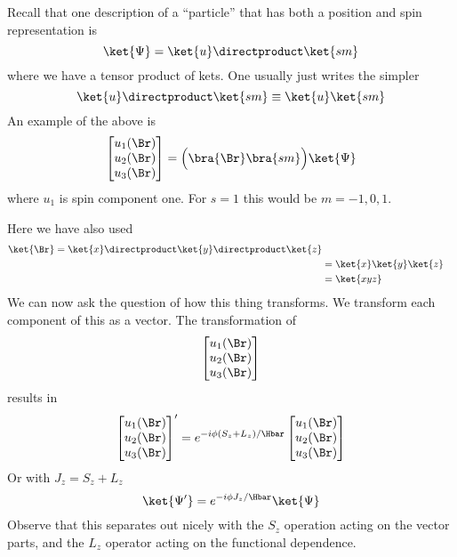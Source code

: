 Recall that one description of a ``particle'' that has both a position and spin representation is
%
\begin{equation}\label{eqn:PHY356FDec7:190}
\ket{\Psi} = \ket{u} \directproduct \ket{s m}
\end{equation}
%
where we have a tensor product of kets.  One usually just writes the simpler
\begin{equation}\label{eqn:PHY356FDec7:195}
\ket{u} \directproduct \ket{s m} \equiv \ket{u} \ket{s m}
\end{equation}
%
An example of the above is
\begin{equation}\label{eqn:PHY356FDec7:200}
\begin{bmatrix}
u_1(\Br) \\
u_2(\Br) \\
u_3(\Br) \\
\end{bmatrix}
= \Bigl( \bra{\Br} \bra{ s m} \Bigr) \ket{\Psi}
\end{equation}
%
where \(u_1\) is spin component one.  For \(s=1\) this would be \(m=-1, 0, 1\).

Here we have also used
\begin{equation}\label{eqn:lecture12rotationsAndAngularMomentum:340}
\begin{aligned}
\ket{\Br}
=
\ket{x}
\directproduct
\ket{y}
\directproduct
\ket{z} \\
&=
\ket{x}
\ket{y}
\ket{z} \\
&=
\ket{x y z}
\end{aligned}
\end{equation}
%
We can now ask the question of how this thing transforms.  We transform each component of this as a vector.  The transformation of
%
\begin{equation}\label{eqn:lecture12rotationsAndAngularMomentum:360}
\begin{aligned}
\begin{bmatrix}
u_1(\Br) \\
u_2(\Br) \\
u_3(\Br)
\end{bmatrix}
\end{aligned}
\end{equation}
%
results in
\begin{equation}\label{eqn:PHY356FDec7:210}
{\begin{bmatrix}
u_1(\Br) \\
u_2(\Br) \\
u_3(\Br)
\end{bmatrix}}'
=
e^{ -i \phi (S_z + L_z)/\Hbar }
\begin{bmatrix}
u_1(\Br) \\
u_2(\Br) \\
u_3(\Br)
\end{bmatrix}
\end{equation}
%
Or with \(J_z = S_z + L_z\)
\begin{equation}\label{eqn:PHY356FDec7:220}
\ket{\Psi'} = e^{-i \phi J_z/\Hbar } \ket{\Psi}
\end{equation}
%
Observe that this separates out nicely with the \(S_z\) operation acting on the vector parts, and the \(L_z\) operator acting on the functional dependence.
